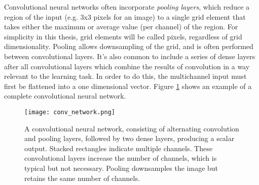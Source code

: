 Convolutional neural networks often incorporate \textit{pooling layers}, which reduce a region of the input (e.g. 3x3 pixels for an image) to a single grid element that takes either the maximum or average value (per channel) of the region. 
For simplicity in this thesis, grid elements will be called pixels, regardless of grid dimensionality.
Pooling allows downsampling of the grid, and is often performed between convolutional layers. 
It's also common to include a series of dense layers after all convolutional layers which combine the results of convolution in a way relevant to the learning task.
In order to do this, the multichannel input must first be flattened into a one dimensional vector.
Figure \ref{fig:conv_network} shows an example of a complete convolutional neural network.

\begin{figure}
	\centering
	\texttt{[image: conv\_network.png]}
	\caption{A convolutional neural network, consisting of alternating convolution and pooling layers, followed by two dense layers, producing a scalar output. Stacked rectangles indicate multiple channels. These convolutional layers increase the number of channels, which is typical but not necessary. Pooling downsamples the image but retains the same number of channels.}
	\label{fig:conv_network}
\end{figure}


